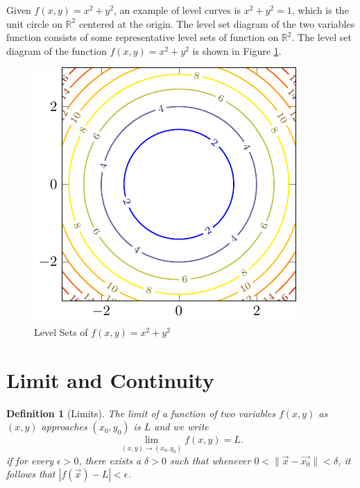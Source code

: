 \documentclass{book}
\newtheorem{definition}{Definition}[chapter]
\theoremstyle{remark}
\begin{document}
Given $f(x, y) = x^2 + y^2$, an example of level curves is $x^2 + y^2 = 1$, which is the unit circle on $\mathbb{R}^2$ centered at the origin. The level set diagram of the two variables function consists of some representative level sets of function on $\mathbb{R}^2$. The level set diagram of the function $f(x, y) = x^2 + y^2$ is shown in Figure \ref{fig:level_sets}.

\begin{figure}[ht]
    \centering
    \includegraphics{figures/level_sets.pdf}
    \caption{Level Sets of $f(x, y) = x^2 + y^2$}\label{fig:level_sets}
\end{figure}

\section{Limit and Continuity}

\begin{definition}[Limits]
    The limit of a function of two variables $f(x, y)$ as $(x, y)$ approaches $(x_0, y_0)$ is $L$ and we write 
    \[
        \lim_{(x, y) \to (x_0, y_0)} f(x, y) = L.
    \]
    if for every $\epsilon > 0$, there exists a $\delta > 0$ such that whenever $0 < \| \vec{x} - \vec{x_0} \| < \delta$, it follows that $|f(\vec{x}) - L| < \epsilon$.
\end{definition}
\end{document}
